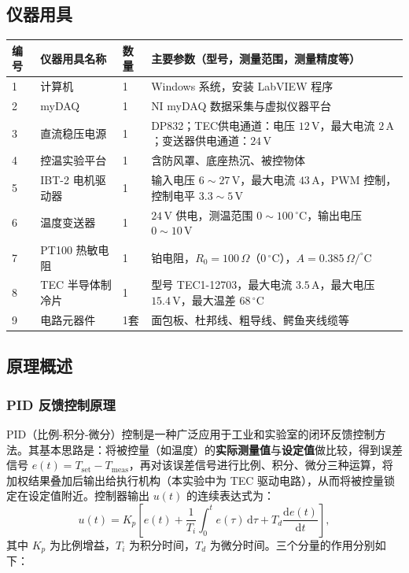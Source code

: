 \documentclass[dvipsnames, svgnames,a4paper,11pt]{article}
\begin{document}
\subsection{仪器用具}
\begin{table}[htbp]
	\centering
	\renewcommand\arraystretch{1.6}
	\begin{tabular}{p{}|p{}|p{}|p{}}
	\hline
	编号 & 仪器用具名称 & 数量 & 主要参数（型号，测量范围，测量精度等） \\
	\hline
	1 & 计算机       & 1   & Windows 系统，安装 LabVIEW 程序 \\
	2 & myDAQ        & 1   & NI myDAQ 数据采集与虚拟仪器平台 \\
	3 & 直流稳压电源 & 1   & DP832；TEC供电通道：电压 $12\,\mathrm{V}$，最大电流 $2\,\mathrm{A}$；变送器供电通道：$24\,\mathrm{V}$ \\
	4 & 控温实验平台 & 1   & 含防风罩、底座热沉、被控物体 \\
	5 & IBT-2 电机驱动器 & 1 & 输入电压 $6\sim27\,\mathrm{V}$，最大电流 $43\,\mathrm{A}$，PWM 控制，控制电平 $3.3\sim5\,\mathrm{V}$ \\
	6 & 温度变送器   & 1   & $24\,\mathrm{V}$ 供电，测温范围 $0\sim100\,^\circ\mathrm{C}$，输出电压 $0\sim10\,\mathrm{V}$ \\
	7 & PT100 热敏电阻 & 1 & 铂电阻，$R_0=100\,\Omega$（$0\,^\circ\mathrm{C}$），$A=0.385\,\Omega/^\circ\mathrm{C}$ \\
	8 & TEC 半导体制冷片 & 1 & 型号 TEC1-12703，最大电流 $3.5\,\mathrm{A}$，最大电压 $15.4\,\mathrm{V}$，最大温差 $68\,^\circ\mathrm{C}$ \\
	9 & 电路元器件   & 1套 & 面包板、杜邦线、粗导线、鳄鱼夹线缆等 \\
	\hline
\end{tabular}
\end{table}

\subsection{原理概述}

\subsubsection{PID 反馈控制原理}

PID（比例-积分-微分）控制是一种广泛应用于工业和实验室的闭环反馈控制方法。其基本思路是：将被控量（如温度）的\textbf{实际测量值}与\textbf{设定值}做比较，得到误差信号 $e(t)=T_\mathrm{set}-T_\mathrm{meas}$，再对该误差信号进行比例、积分、微分三种运算，将加权结果叠加后输出给执行机构（本实验中为 TEC 驱动电路），从而将被控量锁定在设定值附近。控制器输出 $u(t)$ 的连续表达式为：
\begin{equation}
	u(t) = K_p\!\left[e(t) + \frac{1}{T_i}\int_0^t e(\tau)\,\mathrm{d}\tau + T_d\frac{\mathrm{d}e(t)}{\mathrm{d}t}\right],
	\label{eq:PID}
\end{equation}
其中 $K_p$ 为比例增益，$T_i$ 为积分时间，$T_d$ 为微分时间。三个分量的作用分别如下：
\end{document}
